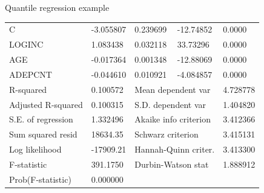 \documentclass{beamer}
\begin{document}
\begin{frame}{Quantile regression example}
\begin{table}[]
\begin{tabular}{@{}lllll@{}}
\midrule
C                                                    & -3.055807                                    & 0.239699                                    & -12.74852                                    & 0.0000                                    \\
LOGINC                                               & 1.083438                                     & 0.032118                                    & 33.73296                                     & 0.0000                                    \\
AGE                                                  & -0.017364                                    & 0.001348                                    & -12.88069                                    & 0.0000                                    \\
ADEPCNT                                              & -0.044610                                    & 0.010921                                    & -4.084857                                    & 0.0000                                    \\
\midrule
R-squared                                            & 0.100572                                     & \multicolumn{2}{l}{Mean dependent var}                                                     & 4.728778                                  \\
Adjusted R-squared                                   & 0.100315                                     & \multicolumn{2}{l}{S.D. dependent var}                                                     & 1.404820                                  \\
S.E. of regression                                   & 1.332496                                     & \multicolumn{2}{l}{Akaike info criterion}                                                  & 3.412366                                  \\
Sum squared resid                                    & 18634.35                                     & \multicolumn{2}{l}{Schwarz criterion}                                                      & 3.415131                                  \\
Log likelihood                                       & -17909.21                                    & \multicolumn{2}{l}{Hannah-Quinn criter.}                                                   & 3.413300                                  \\
F-statistic                                          & 391.1750                                     & \multicolumn{2}{l}{Durbin-Watson stat}                                                     & 1.888912                                  \\
Prob(F-statistic)                                    & 0.000000                                     & \multicolumn{2}{l}{}                                                                       &                                           \\ \bottomrule
\end{tabular}
\end{table}
\end{frame}
\end{document}
